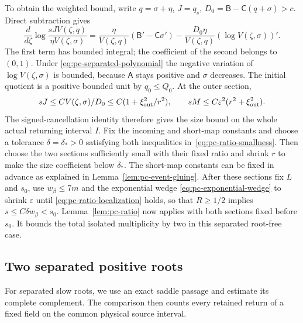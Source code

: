 To obtain the weighted bound, write $q=\sigma+\eta$, $J=q_s$,
$D_0=\mathsf B-\mathsf C(q+\sigma)>c$. Direct subtraction gives
\begin{equation}
\label{eq:pc-signed-cancellation}
 \frac d{d\zeta}\log\frac{sJV(\zeta,q)}{\eta V(\zeta,\sigma)}
 =\frac{\eta}{V(\zeta,q)}(\mathsf B'-\mathsf C\sigma')
 -\frac{D_0\eta}{V(\zeta,q)}(\log V(\zeta,\sigma))'.
\end{equation}
The first term has bounded integral; the coefficient of the second
belongs to $(0,1)$. Under \eqref{eq:pc-separated-polynomial} the
negative variation of $\log V(\zeta,\sigma)$ is bounded, because
$\mathsf A$ stays positive and $\sigma$ decreases. The initial
quotient is a positive bounded unit by $q_0\le Q_0$. At the outer
section,
\[
 sJ\le C V(\zeta,\sigma)/D_0\le C(1+\xi_{\rm out}^2/r^2),
 \qquad sM\le C\varepsilon^2(r^2+\xi_{\rm out}^2).
\]
The signed-cancellation identity therefore gives the size bound on the
whole actual returning interval $I$. Fix the incoming and short-map
constants and choose a tolerance $\delta=\delta_*>0$ satisfying both
inequalities in~\eqref{eq:pc-ratio-smallness}. Then choose the two sections
sufficiently small with their fixed ratio and shrink $r$ to make the size
coefficient below $\delta_*$. The short-map constants can be fixed in advance
as explained in Lemma~\ref{lem:pc-event-gluing}. After these sections
fix $L$ and $s_0$, use $w_\beta\le7m$ and the exponential wedge
\eqref{eq:pc-exponential-wedge} to shrink $\varepsilon$ until
\eqref{eq:pc-ratio-localization} holds, so that
$R\ge1/2$ implies $s\le C\delta w_\beta<s_0$.
Lemma~\ref{lem:pc-ratio} now applies with both sections fixed before $s_0$. It bounds the total isolated multiplicity by two in this
separated root-free case.

\subsection{Two separated positive roots}

For separated slow roots, we use an exact saddle passage and estimate
its complete complement. The comparison then counts every retained
return of a fixed field on the common physical source interval.

